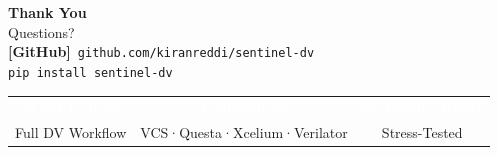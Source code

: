 \documentclass[aspectratio=169,t]{beamer}
\begin{document}
\begin{frame}[plain]
  \begin{center}
    \vspace{1.5em}
    {\Huge\color{white}\textbf{Thank You}}\\[1em]
    {\large\color{sdvteal} Questions?}\\[2em]
    {\large\color{white}
      \textbf{[GitHub]}\ \texttt{github.com/kiranreddi/sentinel-dv}\\[0.5em]
      \texttt{pip install sentinel-dv}
    }\\[2em]
    \begin{tabular}{ccc}
      \textcolor{white}{\textbf{28 MCP Tools}} &
      \textcolor{white}{\textbf{4 Simulators}} &
      \textcolor{white}{\textbf{50 Jenkins Roots}} \\
      \textcolor{sdvteal}{Full DV Workflow} &
      \textcolor{sdvteal}{VCS·Questa·Xcelium·Verilator} &
      \textcolor{sdvteal}{Stress-Tested} \\
    \end{tabular}
  \end{center}
\end{frame}
\end{document}
